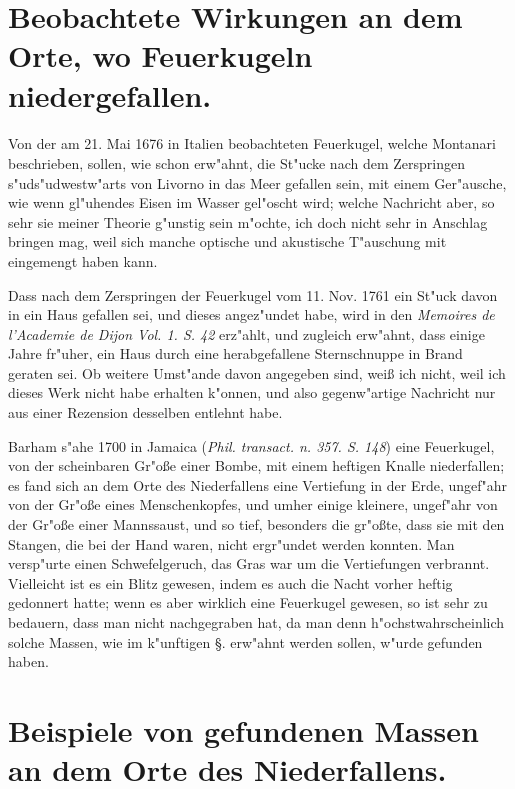 \documentclass[a4paper, 11pt, oneside, polutonikogreek, german]{article}
\begin{document}
\section{Beobachtete Wirkungen an dem Orte, wo Feuerkugeln niedergefallen.}
\paragraph{}
Von der am 21. Mai 1676 in Italien beobachteten Feuerkugel, welche Montanari beschrieben, sollen, wie schon erw"ahnt, die St"ucke nach dem Zerspringen s"uds"udwestw"arts von Livorno in das Meer gefallen sein, mit einem Ger"ausche, wie wenn gl"uhendes Eisen im Wasser gel"oscht wird; welche Nachricht aber, so sehr sie meiner Theorie g"unstig sein m"ochte, ich doch nicht sehr in Anschlag bringen mag, weil sich manche optische und akustische T"auschung mit eingemengt haben kann.

Dass nach dem Zerspringen der Feuerkugel vom 11. Nov. 1761 ein St"uck davon in ein Haus gefallen sei, und dieses angez"undet habe, wird in den \emph{Memoires de l'Academie de Dijon Vol. 1. S. 42} erz"ahlt, und zugleich erw"ahnt, dass einige Jahre fr"uher, ein Haus durch eine herabgefallene Sternschnuppe in Brand geraten sei. Ob weitere Umst"ande davon angegeben sind, weiß ich nicht, weil ich dieses Werk nicht habe erhalten k"onnen, und also gegenw"artige Nachricht nur aus einer Rezension desselben entlehnt habe.

Barham s"ahe 1700 in Jamaica (\emph{Phil. transact. n. 357. S. 148}) eine Feuerkugel, von der scheinbaren Gr"oße einer Bombe, mit einem heftigen Knalle niederfallen; es fand sich an dem Orte des Niederfallens eine Vertiefung in der Erde, ungef"ahr von der Gr"oße eines Menschenkopfes, und umher einige kleinere, ungef"ahr von der Gr"oße einer Mannssaust, und so tief, besonders die gr"oßte, dass sie mit den Stangen, die bei der Hand waren, nicht ergr"undet werden konnten. Man versp"urte einen Schwefelgeruch, das Gras war um die Vertiefungen verbrannt. Vielleicht ist es ein Blitz gewesen, indem es auch die Nacht vorher heftig gedonnert hatte; wenn es aber wirklich eine Feuerkugel gewesen, so ist sehr zu bedauern, dass man nicht nachgegraben hat, da man denn h"ochstwahrscheinlich solche Massen, wie im k"unftigen §. erw"ahnt werden sollen, w"urde gefunden haben.
\clearpage
\section{Beispiele von gefundenen Massen an dem Orte des Niederfallens.}
\end{document}
